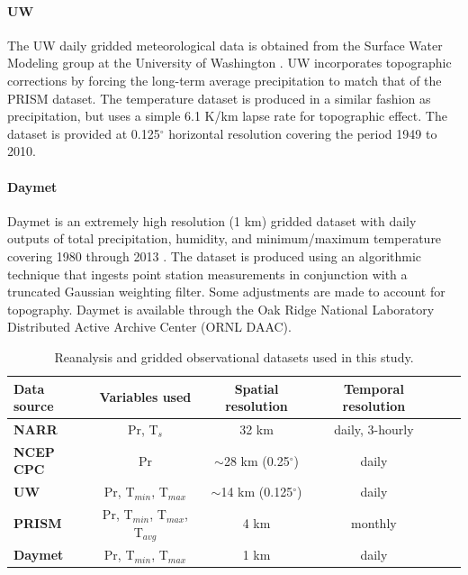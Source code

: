 \paragraph{UW} The UW daily gridded meteorological data is obtained from the Surface Water Modeling group at the University of Washington \cite{maurer2002long, hamlet2005production}. UW incorporates topographic corrections by forcing the long-term average precipitation to match that of the PRISM dataset. The temperature dataset is produced in a similar fashion as precipitation, but uses a simple 6.1 K/km lapse rate for topographic effect. The dataset is provided at 0.125$^\circ$ horizontal resolution covering the period 1949 to 2010.


\paragraph{Daymet}  Daymet is an extremely high resolution (1 km) gridded dataset with daily outputs of total precipitation, humidity, and minimum/maximum temperature covering 1980 through 2013 \cite{thornton1997generating, thornton2014daymet}. The dataset is produced using an algorithmic technique that ingests point station measurements in conjunction with a truncated Gaussian weighting filter.  Some adjustments are made to account for topography. Daymet is available through the Oak Ridge National Laboratory Distributed Active Archive Center (ORNL DAAC). 

\begin{table}
\caption{Reanalysis and gridded observational datasets used in this study.} \label{tab:Datasets}
\begin{center}
\begin{tabular}{lccccc} 
\hline \textbf{Data source} & \textbf{Variables used} & \textbf{Spatial resolution} & \textbf{Temporal resolution} \\
\hline \textbf{NARR} & Pr, T$_{s}$ & 32 km & daily, 3-hourly \\
\textbf{NCEP CPC} & Pr & $\sim$28 km (0.25$^\circ$) & daily \\
\textbf{UW} & Pr, T$_{min}$, T$_{max}$ & $\sim$14 km (0.125$^\circ$) & daily \\
\textbf{PRISM} & Pr, T$_{min}$, T$_{max}$, T$_{avg}$ & 4 km & monthly \\
\textbf{Daymet} & Pr, T$_{min}$, T$_{max}$ & 1 km & daily \\
\hline
\end{tabular}
\end{center}
\end{table}

